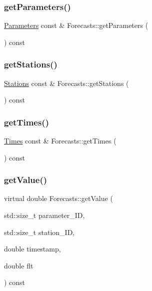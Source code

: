 \subsubsection{\texorpdfstring{get\+Parameters()}{getParameters()}}
{\footnotesize\ttfamily \mbox{\hyperlink{class_parameters}{Parameters}} const  \& Forecasts\+::get\+Parameters (\begin{DoxyParamCaption}{ }\end{DoxyParamCaption}) const}

\mbox{\label{class_forecasts_a3db4c9546c88683586b606500a5e3c22}} 
\subsubsection{\texorpdfstring{get\+Stations()}{getStations()}}
{\footnotesize\ttfamily \mbox{\hyperlink{class_stations}{Stations}} const  \& Forecasts\+::get\+Stations (\begin{DoxyParamCaption}{ }\end{DoxyParamCaption}) const}

\mbox{\label{class_forecasts_a269d0121cfb01a9f3299df572c7f83be}} 
\subsubsection{\texorpdfstring{get\+Times()}{getTimes()}}
{\footnotesize\ttfamily \mbox{\hyperlink{class_times}{Times}} const  \& Forecasts\+::get\+Times (\begin{DoxyParamCaption}{ }\end{DoxyParamCaption}) const}

\mbox{\label{class_forecasts_a07a51e97b54a5c42d197fb4804ee43bc}} 
\subsubsection{\texorpdfstring{get\+Value()}{getValue()}}
{\footnotesize\ttfamily virtual double Forecasts\+::get\+Value (\begin{DoxyParamCaption}\item[{std\+::size\+\_\+t}]{parameter\+\_\+\+ID,  }\item[{std\+::size\+\_\+t}]{station\+\_\+\+ID,  }\item[{double}]{timestamp,  }\item[{double}]{flt }\end{DoxyParamCaption}) const\hspace{0.3cm}{\ttfamily [pure virtual]}}



